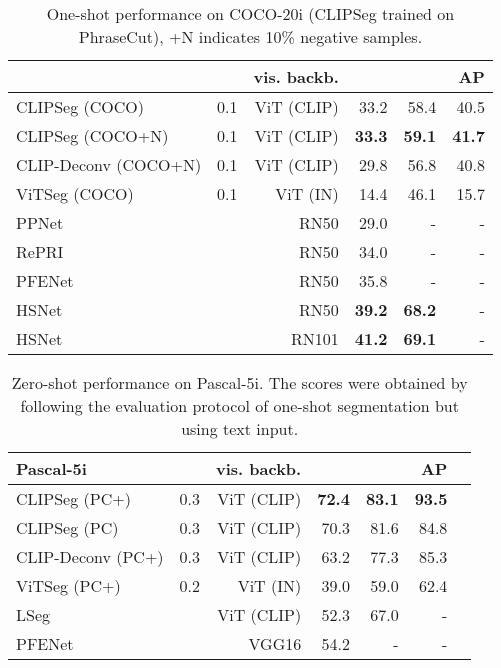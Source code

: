 \documentclass[10pt,twocolumn,letterpaper]{article}
\begin{document}
\begin{table}[t]
    \centering
    \footnotesize
    \setlength{\tabcolsep}{1.7mm}
    \begin{tabular}{llrrrr}
        \midrule
        &  & vis. backb. &  &  &  AP  \\
        \midrule
CLIPSeg (COCO) & 0.1 & ViT (CLIP) &  33.2 & 58.4 & 40.5 \\
CLIPSeg (COCO+N)  & 0.1 & ViT (CLIP) &  \textbf{33.3} & \textbf{59.1} & \textbf{41.7} \\
CLIP-Deconv (COCO+N)  & 0.1 & ViT (CLIP) &  29.8 & 56.8 & 40.8 \\
ViTSeg (COCO)  & 0.1 & ViT (IN) &  14.4 & 46.1 & 15.7 \\
        \midrule
        PPNet \cite{liu20} & & RN50 & 29.0  & - & -  \\
        RePRI \cite{boudiaf20} & & RN50  & 34.0  & - & - \\
        PFENet \cite{tian20a} & & RN50 & 35.8 & - & - \\
        HSNet \cite{min21hsnet} & & RN50 & \textbf{39.2} & \textbf{68.2} & - \\
        \midrule
        HSNet \cite{min21hsnet} & & RN101 & \textbf{41.2} & \textbf{69.1} & - \\
        \bottomrule
    \end{tabular} \caption{One-shot performance on COCO-20i (CLIPSeg trained on PhraseCut), +N indicates 10\% negative samples.}
    \label{tab:coco20i_oneshot}
\end{table}

\begin{table}[t]
    \centering
    \footnotesize
    \setlength{\tabcolsep}{1mm}
    \begin{tabular}{llrrrrr}
         \toprule 
        \textbf{Pascal-5i} &  & vis. backb. &  &  &  AP \\
        \midrule
CLIPSeg (PC+) & 0.3 & ViT (CLIP) & \textbf{72.4} & \textbf{83.1} & \textbf{93.5} \\
CLIPSeg (PC) & 0.3 & ViT (CLIP) & 70.3 & 81.6 & 84.8 \\
CLIP-Deconv (PC+) & 0.3 & ViT (CLIP) & 63.2 & 77.3 & 85.3 \\
ViTSeg (PC+) & 0.2 & ViT (IN) & 39.0 & 59.0 & 62.4 \\
        \midrule
        LSeg  \cite{li2022languagedriven} & & ViT (CLIP) & 52.3 & 67.0 & -  \\
        PFENet \cite{tian20a} & & VGG16 & 54.2 & - & - \\
        \bottomrule
    \end{tabular}\caption{Zero-shot performance on Pascal-5i. The scores were obtained by following the evaluation protocol of one-shot segmentation but using text input.}
    \label{tab:pas5i_zeroshot}
\end{table}
\end{document}
